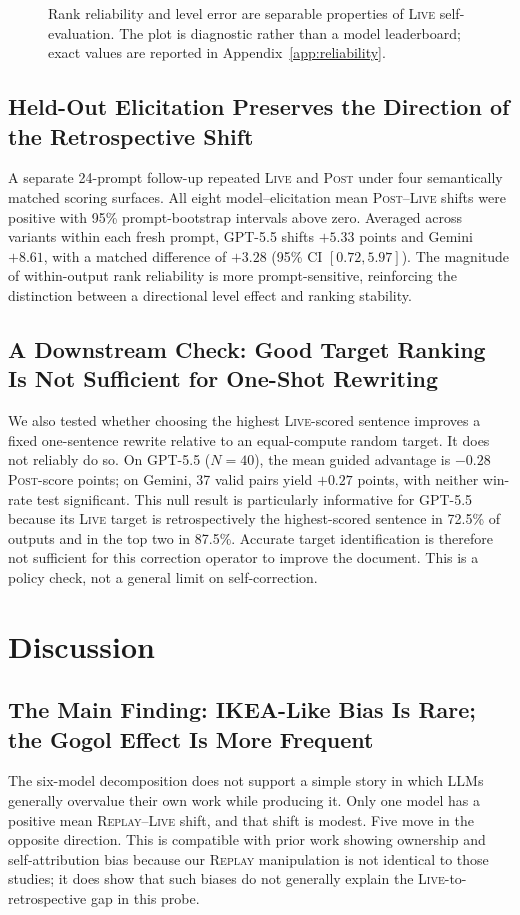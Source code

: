\documentclass[10pt]{article}
\newcommand{\live}{\textsc{Live}}
\newcommand{\replay}{\textsc{Replay}}
\newcommand{\post}{\textsc{Post}}
\newcommand{\papersection}[1]{\Needspace{4.4\baselineskip}\section{#1}}
\newcommand{\papersubsection}[1]{\Needspace{3.8\baselineskip}\subsection{#1}}
\begin{document}
\begin{figure}[t]
\centering
\ReliabilityMapPlot
\caption{Rank reliability and level error are separable properties of \live{} self-evaluation. The plot is diagnostic rather than a model leaderboard; exact values are reported in Appendix~\ref{app:reliability}.}
\label{fig:map}
\end{figure}

\papersubsection{Held-Out Elicitation Preserves the Direction of the Retrospective Shift}
A separate 24-prompt follow-up repeated \live{} and \post{} under four semantically matched scoring surfaces. All eight model--elicitation mean \post{}--\live{} shifts were positive with 95\% prompt-bootstrap intervals above zero. Averaged across variants within each fresh prompt, GPT-5.5 shifts $+5.33$ points and Gemini $+8.61$, with a matched difference of $+3.28$ (95\% CI $[0.72,5.97]$). The magnitude of within-output rank reliability is more prompt-sensitive, reinforcing the distinction between a directional level effect and ranking stability.

\papersubsection{A Downstream Check: Good Target Ranking Is Not Sufficient for One-Shot Rewriting}
We also tested whether choosing the highest \live{}-scored sentence improves a fixed one-sentence rewrite relative to an equal-compute random target. It does not reliably do so. On GPT-5.5 ($N=40$), the mean guided advantage is $-0.28$ \post{}-score points; on Gemini, 37 valid pairs yield $+0.27$ points, with neither win-rate test significant. This null result is particularly informative for GPT-5.5 because its \live{} target is retrospectively the highest-scored sentence in 72.5\% of outputs and in the top two in 87.5\%. Accurate target identification is therefore not sufficient for this correction operator to improve the document. This is a policy check, not a general limit on self-correction.

\papersection{Discussion}
\papersubsection{The Main Finding: IKEA-Like Bias Is Rare; the Gogol Effect Is More Frequent}
The six-model decomposition does not support a simple story in which LLMs generally overvalue their own work while producing it. Only one model has a positive mean \replay{}--\live{} shift, and that shift is modest. Five move in the opposite direction. This is compatible with prior work showing ownership and self-attribution bias because our \replay{} manipulation is not identical to those studies; it does show that such biases do not generally explain the \live{}-to-retrospective gap in this probe.
\end{document}
